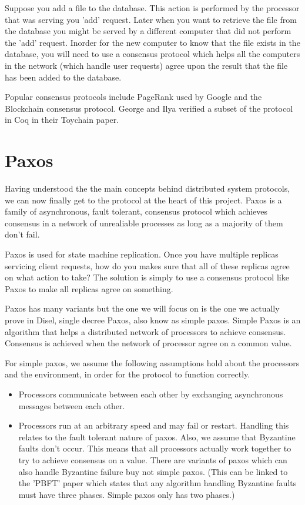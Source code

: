 Suppose you add a file to the database. This action is performed by the processor that
was serving you 'add' request. Later when you want to retrieve the file from the database
you might be served by a different computer that did not perform the 'add' request. Inorder
for the new computer to know that the file exists in the database, you will need to use a
consensus protocol which helps all the computers in the network (which handle user
requests) agree upon the result that the file has been added to the database.

Popular consensus protocols include PageRank used by Google and the Blockchain
consensus protocol. George and Ilya verified a subset of the protocol in Coq in
their Toychain paper.


\section{Paxos}
Having understood the the main concepts behind distributed system protocols, we can
now finally get to the protocol at the heart of this project. Paxos is a family of
asynchronous, fault tolerant, consensus protocol which achieves consensus in a network
of unrealiable processes as long as a majority of them don't fail.

Paxos is used for state machine replication. Once you have multiple replicas
servicing client requests, how do you makes sure that all of these replicas agree
on what action to take? The solution is simply to use a consensus protocol like
Paxos to make all replicas agree on something.

Paxos has many variants but the one we will focus on is the one we actually prove
in Disel, single decree Paxos, also know as simple paxos. Simple Paxos is an algorithm
that helps a distributed network of processors to achieve consensus.
Consensus is achieved when the network of processor agree on a common value.

For simple paxos, we assume the following assumptions hold about the processors
and the environment, in order for the protocol to function correctly.
\begin{itemize}
  \item Processors communicate between each other by exchanging asynchronous messages between each other.
  \item Processors run at an arbitrary speed and may fail or restart. Handling this relates
    to the fault tolerant nature of paxos. Also, we assume that Byzantine faults don't occur.
    This means that all processors actually work together to try to achieve consensus on a value.
    There are variants of paxos which can also handle Byzantine failure buy not simple paxos.
    (This can be linked to the 'PBFT' paper which states that any algorithm handling
    Byzantine faults must have three phases. Simple paxos only has two phases.)
\end{itemize}

